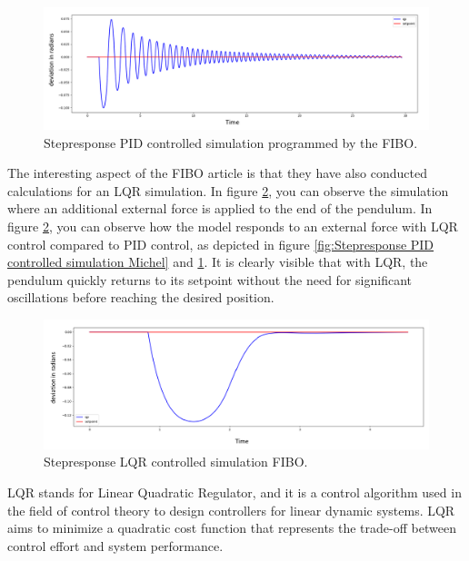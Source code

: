 \documentclass{article}
\begin{document}
\begin{multicols}{2}
\begin{figure}[H]
\centering
\includegraphics[scale=0.37]{Stepresponse FIBO}
\caption{Stepresponse PID controlled simulation programmed by the FIBO.}
\label{fig:Stepresponse PID controlled simulation FIBO}
\end{figure}


The interesting aspect of the FIBO article is that they have also conducted calculations for an LQR simulation. In figure \ref{fig:Stepresponse LQR controlled simulation FIBO}, you can observe the simulation where an additional external force is applied to the end of the pendulum. In figure \ref{fig:Stepresponse LQR controlled simulation FIBO}, you can observe how the model responds to an external force with LQR control compared to PID control, as depicted in figure \ref{fig:Stepresponse PID controlled simulation Michel} and \ref{fig:Stepresponse PID controlled simulation FIBO}. It is clearly visible that with LQR, the pendulum quickly returns to its setpoint without the need for significant oscillations before reaching the desired position.

\begin{figure}[H]
\centering
\includegraphics[scale=0.37]{Stepresponse FIBO LQR}
\caption{Stepresponse LQR controlled simulation FIBO.}
\label{fig:Stepresponse LQR controlled simulation FIBO}
\end{figure}


LQR stands for Linear Quadratic Regulator, and it is a control algorithm used in the field of control theory to design controllers for linear dynamic systems. LQR aims to minimize a quadratic cost function that represents the trade-off between control effort and system performance.


\end{multicols}
\end{document}
